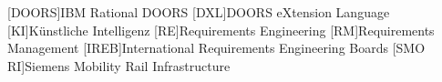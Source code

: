 
\begin{acronym}
	[DOORS]{IBM Rational DOORS}
	[DXL]{DOORS eXtension Language}
	[KI]{Künstliche Intelligenz}
	[RE]{Requirements Engineering}
	[RM]{Requirements Management}
	[IREB]{International Requirements Engineering Boards}
	[SMO RI]{Siemens Mobility Rail Infrastructure}
\end{acronym}


